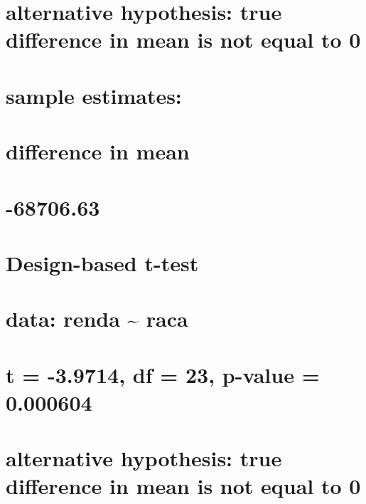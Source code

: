 \documentclass[]{book}
\theoremstyle{definition}
\theoremstyle{definition}
\theoremstyle{definition}
\theoremstyle{remark}
\begin{document}
\section{alternative hypothesis: true difference in mean is not equal to
0}\label{alternative-hypothesis-true-difference-in-mean-is-not-equal-to-0}

\section{sample estimates:}\label{sample-estimates}

\section{difference in mean}\label{difference-in-mean}

\section{-68706.63}\label{section-38}

\section{}\label{section-39}

\section{Design-based t-test}\label{design-based-t-test-1}

\section{}\label{section-40}

\section{data: renda \textasciitilde{} raca}\label{data-renda-raca}

\section{t = -3.9714, df = 23, p-value =
0.000604}\label{t--3.9714-df-23-p-value-0.000604}

\section{alternative hypothesis: true difference in mean is not equal to
0}\label{alternative-hypothesis-true-difference-in-mean-is-not-equal-to-0-1}
\end{document}
